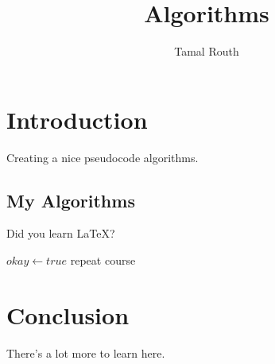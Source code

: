 \documentclass{article}
\title{Algorithms}
\author{Tamal Routh}
\begin{document}
\maketitle

\section{Introduction}

Creating a nice pseudocode algorithms.

\subsection{My Algorithms}

Did you learn \LaTeX?

\begin{algorithms}
   \state $okay \gets true$
\Else 
    \state repeat course
  \Endwhile
\EndIf
\end{algorithms}


\section{Conclusion}

There's a lot more to learn here.
\end{document}
